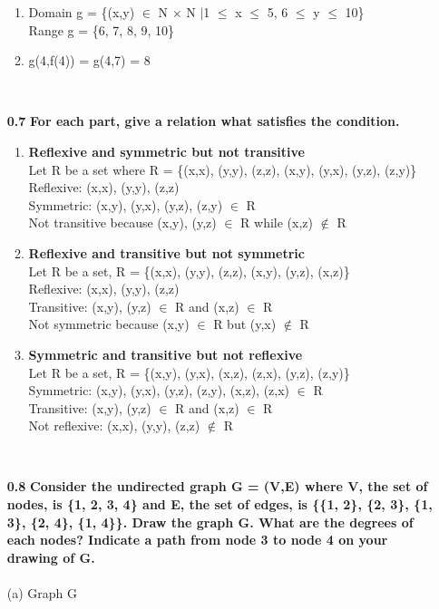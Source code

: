 \documentclass[12pt]{letter}
\begin{document}
\begin{enumerate}
\begin{enumerate}
	\item Domain g = \{(x,y) $\in$ N $\times$ N $|$1 $\leq$ x $\leq$ 5, 6 $\leq$ y $\leq$ 10\} \\ Range g = \{6, 7, 8, 9, 10\}

	\item g(4,f(4)) = g(4,7) = 8
\end{enumerate}

\ \\ %
\item[\textbf{0.7}] \textbf{For each part, give a relation what satisfies the condition.}
\ \\ %
\begin{enumerate}
	\item \textbf{Reflexive and symmetric but not transitive} \\
				Let R be a set where R = \{(x,x), (y,y), (z,z), (x,y), (y,x), (y,z), (z,y)\} \\
				Reflexive: (x,x), (y,y), (z,z) \\
				Symmetric: (x,y), (y,x), (y,z), (z,y) $\in$ R \\
				Not transitive because (x,y), (y,z) $\in$ R while (x,z) $\notin$ R
	
	\item \textbf{Reflexive and transitive but not symmetric} \\
				Let R be a set, R = \{(x,x), (y,y), (z,z), (x,y), (y,z), (x,z)\} \\
				Reflexive: (x,x), (y,y), (z,z) \\
				Transitive: (x,y), (y,z) $\in$ R and (x,z) $\in$ R \\
				Not symmetric because (x,y) $\in$ R but (y,x) $\notin$ R

	\item \textbf{Symmetric and transitive but not reflexive} \\
				Let R be a set, R = \{(x,y), (y,x), (x,z), (z,x), (y,z), (z,y)\} \\
				Symmetric: (x,y), (y,x), (y,z), (z,y), (x,z), (z,x) $\in$ R \\
				Transitive: (x,y), (y,z) $\in$ R and (x,z) $\in$ R \\
				Not reflexive: (x,x), (y,y), (z,z) $\notin$ R
\end{enumerate}

\newpage
\ \\ %
\item[\textbf{0.8}] \textbf{Consider the undirected graph G = (V,E) where V, the set of nodes, is \{1, 2, 3, 4\} and E, the set of edges, is \{\{1, 2\}, \{2, 3\}, \{1, 3\}, \{2, 4\}, \{1, 4\}\}. Draw the graph G. What are the degrees of each nodes? Indicate a path from node 3 to node 4 on your drawing of G.}
\ \\ %
\ \\ %
(a) Graph G


\end{enumerate}
\end{document}
